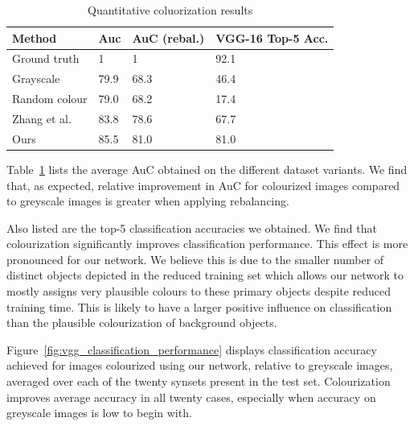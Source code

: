 \documentclass{article}
\begin{document}
\begin{table}
  \centering
  \caption{Quantitative coluorization results}
  \label{tbl:comp-results}
  \begin{tabular}{llll}
    \toprule
    Method        & Auc  & AuC (rebal.)  & VGG-16 Top-5 Acc. \\
    \midrule
    Ground truth  & 1    & 1             & 92.1 \\
    Grayscale     & 79.9 & 68.3          & 46.4 \\
    Random colour & 79.0 & 68.2          & 17.4 \\
    \midrule
    Zhang et al.  & 83.8 & 78.6          & 67.7 \\
    Ours          & 85.5 & 81.0          & 81.0 \\
    \bottomrule
  \end{tabular}
\end{table}

Table~\ref{tbl:comp-results} lists the average AuC obtained on the different
dataset variants. We find that, as expected, relative improvement in AuC for
colourized images compared to greyscale images is greater when applying
rebalancing.

Also listed are the top-5 classification accuracies we obtained. We find that
colourization significantly improves classification performance. This effect is
more pronounced for our network. We believe this is due to the smaller number
of distinct objects depicted in the reduced training set which allows our
network to mostly assigns very plausible colours to these primary objects
despite reduced training time. This is likely to have a larger positive
influence on classification than the plausible colourization of background
objects.

Figure~\ref{fig:vgg_classification_performance} displays classification
accuracy achieved for images colourized using our network, relative to
greyscale images, averaged over each of the twenty synsets present in the test
set. Colourization improves average accuracy in all twenty cases, especially
when accuracy on greyscale images is low to begin with.
\end{document}
